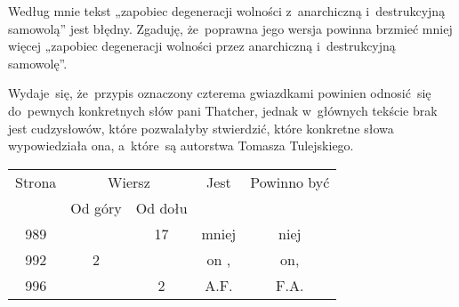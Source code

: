 \documentclass[a4paper,11pt]{article}
\numberwithin{equation}{section}
\begin{document}

\vspace{0em}


\noindent
{} Według mnie tekst „zapobiec degeneracji wolności
z~anarchiczną i~destrukcyjną samowolą” jest błędny. Zgaduję, że~poprawna
jego wersja powinna brzmieć mniej więcej „zapobiec degeneracji wolności
przez anarchiczną i~destrukcyjną samowolę”.

\VerSpaceFour





\noindent
{} Wydaje~się, że~przypis oznaczony czterema gwiazdkami powinien
odnosić~się do~pewnych konkretnych słów pani Thatcher, jednak w~głównych
tekście brak jest cudzysłowów, które pozwalałyby stwierdzić, które
konkretne słowa wypowiedziała ona, a~które~są autorstwa Tomasza Tulejskiego.







\begin{center}

  \begin{tabular}{|c|c|c|c|c|}
    \hline
    Strona & \multicolumn{2}{c|}{Wiersz} & Jest
                              & Powinno być \\ \cline{2-3}
    & Od góry & Od dołu & & \\
    \hline
    989 & & 17 & mniej & niej \\
    992 &  2 & & on , & on, \\
    996 & &  2 & A.F. & F.A. \\
    \hline
  \end{tabular}

\end{center}

\VerSpaceTwo













\printbibliography





\end{document}
